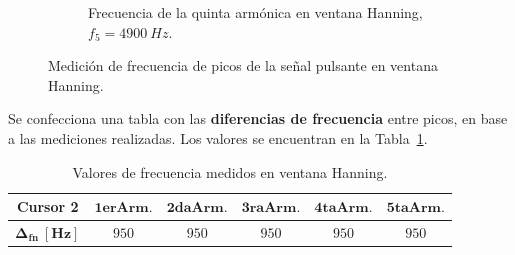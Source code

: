 \begin{figure}[H]
\begin{subfigure}[H]{0.48\textwidth}
          \caption{Frecuencia de la quinta armónica en ventana Hanning, $f_{5}=4900~Hz$.}
        \end{subfigure}

        \caption{Medición de frecuencia de picos de la señal pulsante en ventana Hanning.}
        \label{fig:Exp2SeñalPulsanteArmonicosEspectro}
      \end{figure}     

      Se confecciona una tabla con las \textbf{diferencias de frecuencia} entre picos, en 
      base a las mediciones realizadas. Los valores se encuentran en la 
      Tabla~\ref{tab:Exp2MedicionesHanning}.

      \begin{table}[H]
      \centering
        \begin{tabular}{cccccc} \hline \hline
          \textbf{Cursor 2}               &  $\mathbf{1erArm.}$       & $\mathbf{2daArm.}$        & $\mathbf{3raArm.}$  &   $\mathbf{4taArm.}$ &   $\mathbf{5taArm.}$ \\ \hline
          $\mathbf{\Delta_{fn}~[Hz]}$       &   $950$                        &    $950$                    &   $950$                & $950$                   & $950$                \\
         \end{tabular}
          \caption{Valores de frecuencia medidos en ventana Hanning.}
          \label{tab:Exp2MedicionesHanning}
      \end{table}

